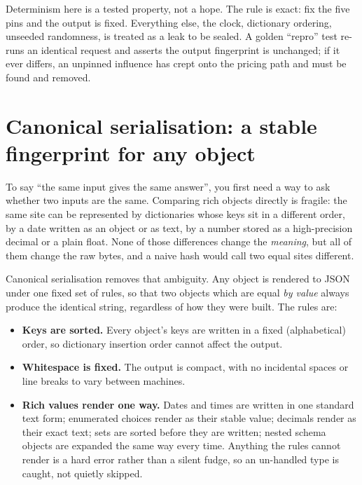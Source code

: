 \begin{keyidea}
Determinism here is a tested property, not a hope. The rule is exact: fix the five pins and the output is fixed. Everything else, the clock, dictionary ordering, unseeded randomness, is treated as a leak to be sealed. A golden ``repro'' test re-runs an identical request and asserts the output fingerprint is unchanged; if it ever differs, an unpinned influence has crept onto the pricing path and must be found and removed.
\end{keyidea}

\section{Canonical serialisation: a stable fingerprint for any object}

To say ``the same input gives the same answer'', you first need a way to ask whether two inputs are the same. Comparing rich objects directly is fragile: the same site can be represented by dictionaries whose keys sit in a different order, by a date written as an object or as text, by a number stored as a high-precision decimal or a plain float. None of those differences change the \emph{meaning}, but all of them change the raw bytes, and a naive hash would call two equal sites different.

Canonical serialisation removes that ambiguity. Any object is rendered to JSON under one fixed set of rules, so that two objects which are equal \emph{by value} always produce the identical string, regardless of how they were built. The rules are:

\begin{itemize}
  \item \textbf{Keys are sorted.} Every object's keys are written in a fixed (alphabetical) order, so dictionary insertion order cannot affect the output.
  \item \textbf{Whitespace is fixed.} The output is compact, with no incidental spaces or line breaks to vary between machines.
  \item \textbf{Rich values render one way.} Dates and times are written in one standard text form; enumerated choices render as their stable value; decimals render as their exact text; sets are sorted before they are written; nested schema objects are expanded the same way every time. Anything the rules cannot render is a hard error rather than a silent fudge, so an un-handled type is caught, not quietly skipped.
\end{itemize}

